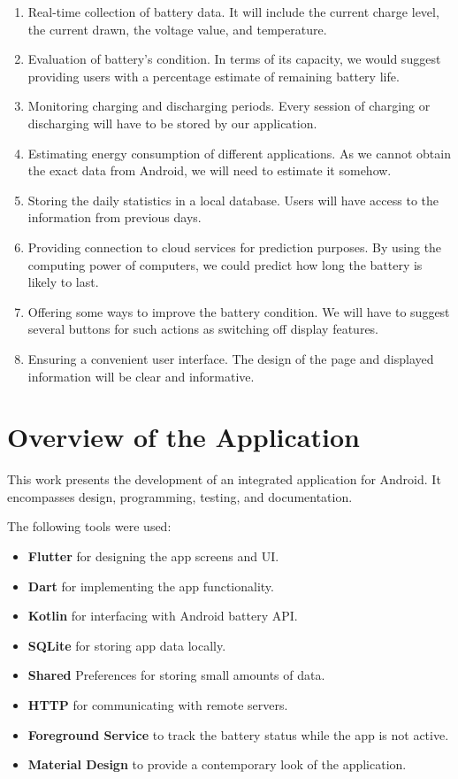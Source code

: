 \documentclass[12pt,a4paper]{report}
\begin{document}
\begin{enumerate}
    \item Real-time collection of battery data. It will include the current charge level, the current drawn, the voltage value, and temperature.
    \item Evaluation of battery's condition. In terms of its capacity, we would suggest providing users with a percentage estimate of remaining battery life.
    \item Monitoring charging and discharging periods. Every session of charging or discharging will have to be stored by our application.
    \item Estimating energy consumption of different applications. As we cannot obtain the exact data from Android, we will need to estimate it somehow.
    \item Storing the daily statistics in a local database. Users will have access to the information from previous days.
    \item Providing connection to cloud services for prediction purposes. By using the computing power of computers, we could predict how long the battery is likely to last.
    \item Offering some ways to improve the battery condition. We will have to suggest several buttons for such actions as switching off display features.
    \item Ensuring a convenient user interface. The design of the page and displayed information will be clear and informative.
\end{enumerate}
\section{Overview of the Application}
This work presents the development of an integrated application for Android. It encompasses design, programming, testing, and documentation.

The following tools were used:

\begin{itemize}
    \item \textbf{Flutter} for designing the app screens and UI.
    \item \textbf{Dart} for implementing the app functionality.
    \item \textbf{Kotlin} for interfacing with Android battery API.
    \item \textbf{SQLite} for storing app data locally.
    \item \textbf{Shared} Preferences for storing small amounts of data.
    \item \textbf{HTTP} for communicating with remote servers.
    \item \textbf{Foreground Service} to track the battery status while the app is not active.
    \item \textbf{Material Design} to provide a contemporary look of the application.
\end{itemize}
\end{document}
